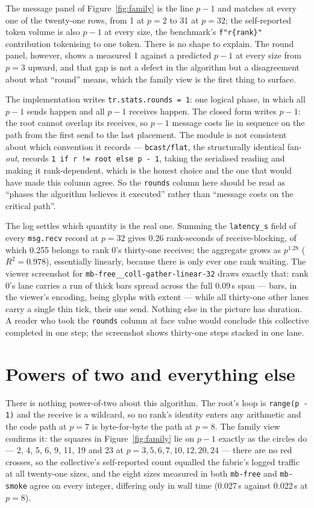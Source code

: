 \documentclass[11pt]{article}
\begin{document}
The message panel of Figure~\ref{fig:family} is the line $p-1$ and matches at every one of the
twenty-one rows, from 1 at $p=2$ to 31 at $p=32$; the self-reported token volume is also $p-1$
at every size, the benchmark's \verb|f"r{rank}"| contribution tokenising to one token. There is
no shape to explain. The round panel, however, shows a measured 1 against a predicted $p-1$ at
every size from $p=3$ upward, and that gap is not a defect in the algorithm but a disagreement
about what ``round'' means, which the family view is the first thing to surface.

The implementation writes \texttt{tr.stats.rounds = 1}: one logical phase, in which all $p-1$
sends happen and all $p-1$ receives happen. The closed form writes $p-1$: the root cannot
overlap its receives, so $p-1$ message costs lie in sequence on the path from the first send to
the last placement. The module is not consistent about which convention it records ---
\texttt{bcast/flat}, the structurally identical fan-\emph{out}, records
\texttt{1 if r != root else p - 1}, taking the serialised reading and making it rank-dependent,
which is the honest choice and the one that would have made this column agree. So the
\texttt{rounds} column here should be read as ``phases the algorithm believes it executed''
rather than ``message costs on the critical path''.

The log settles which quantity is the real one. Summing the \texttt{latency\_s} field of every
\texttt{msg.recv} record at $p=32$ gives 0.26 rank-seconds of receive-blocking, of which 0.255
belongs to rank 0's thirty-one receives; the aggregate grows as $p^{1.28}$ ($R^2 = 0.978$),
essentially linearly, because there is only ever one rank waiting. The viewer screenshot for
\texttt{mb-free\_\_coll-gather-linear-32} draws exactly that: rank 0's lane carries a run of
thick bars spread across the full 0.09\,s span --- bars, in the viewer's encoding, being glyphs
with extent --- while all thirty-one other lanes carry a single thin tick, their one send.
Nothing else in the picture has duration. A reader who took the \texttt{rounds} column at face
value would conclude this collective completed in one step; the screenshot shows thirty-one
steps stacked in one lane.

\section{Powers of two and everything else}

There is nothing power-of-two about this algorithm. The root's loop is \texttt{range(p - 1)} and
the receive is a wildcard, so no rank's identity enters any arithmetic and the code path at
$p=7$ is byte-for-byte the path at $p=8$. The family view confirms it: the squares in
Figure~\ref{fig:family} lie on $p-1$ exactly as the circles do --- 2, 4, 5, 6, 9, 11, 19 and 23
at $p = 3, 5, 6, 7, 10, 12, 20, 24$ --- there are no red crosses, so the collective's
self-reported count equalled the fabric's logged traffic at all twenty-one sizes, and the eight
sizes measured in both \texttt{mb-free} and \texttt{mb-smoke} agree on every integer, differing
only in wall time (0.027\,s against 0.022\,s at $p=8$).
\end{document}
